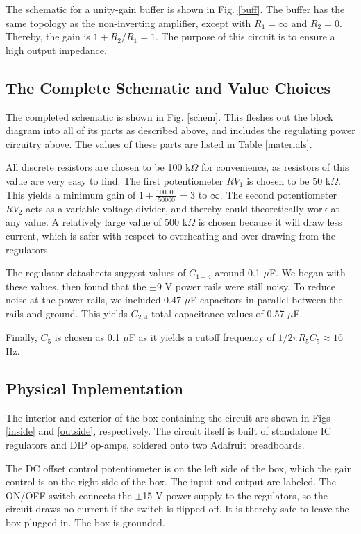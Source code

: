 \documentclass{article}
\begin{document}
\par{The schematic for a unity-gain buffer is shown in Fig. \ref{buff}. The buffer has the same topology as the non-inverting amplifier, except with $R_1 = \infty$ and $R_2 = 0$. Thereby, the gain is $1+R_2/R_1 = 1$. The purpose of this circuit is to ensure a high output impedance.}

\subsection{The Complete Schematic and Value Choices}
\par{The completed schematic is shown in Fig. \ref{schem}. This fleshes out the block diagram into all of its parts as described above, and includes the regulating power circuitry above. The values of these parts are listed in Table \ref{materials}.}

\par{All discrete resistors are chosen to be 100 k$\Omega$ for convenience, as resistors of this value are very easy to find. The first potentiometer $RV_1$ is chosen to be 50 k$\Omega$. This yields a minimum gain of $1 + \frac{100000}{50000} = 3$ to $\infty$. The second potentiometer $RV_2$ acts as a variable voltage divider, and thereby could theoretically work at any value. A relatively large value of 500 k$\Omega$ is chosen because it will draw less current, which is safer with respect to overheating and over-drawing from the regulators.}
\par{The regulator datasheets suggest values of $C_{1-4}$ around 0.1 $\mu$F. We began with these values, then found that the $\pm$9 V power rails were still noisy. To reduce noise at the power rails, we included 0.47 $\mu$F capacitors in parallel between the rails and ground. This yields $C_{2,4}$ total capacitance values of 0.57 $\mu$F.}
\par{Finally, $C_5$ is chosen as 0.1 $\mu$F as it yields a cutoff frequency of $1/2\pi R_5C_5 \approx 16$ Hz.}

\subsection{Physical Inplementation}
\par{The interior and exterior of the box containing the circuit are shown in Figs \ref{inside} and \ref{outside}, respectively. The circuit itself is built of standalone IC regulators and DIP op-amps, soldered onto two Adafruit breadboards.}
\par{The DC offset control potentiometer is on the left side of the box, which the gain control is on the right side of the box. The input and output are labeled. The ON/OFF switch connects the $\pm$15 V power supply to the regulators, so the circuit draws no current if the switch is flipped off. It is thereby safe to leave the box plugged in. The box is grounded.}
\end{document}
